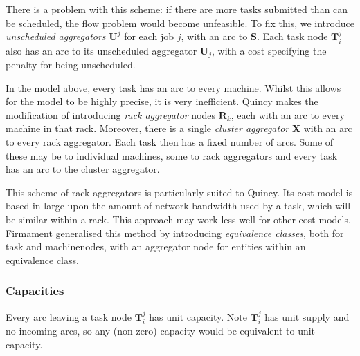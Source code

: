 There is a problem with this scheme: if there are more tasks submitted than can be scheduled, the flow problem would become unfeasible. To fix this, we introduce \emph{unscheduled aggregators} $\mathbf{U}^j$ for each job $j$, with an arc to $\mathbf{S}$. Each task node $\mathbf{T}_i^j$ also has an arc to its unscheduled aggregator $\mathbf{U}_j$, with a cost specifying the penalty for being unscheduled.

In the model above, every task has an arc to every machine. Whilst this allows for the model to be highly precise, it is very inefficient\footnotemark. Quincy makes the modification of introducing \emph{rack aggregator} nodes $\mathbf{R}_k$, each with an arc to every machine in that rack. Moreover, there is a single \emph{cluster aggregator} $\mathbf{X}$ with an arc to every rack aggregator\footnotemark. Each task then has a fixed number of arcs. Some of these may be to individual machines, some to rack aggregators and every task has an arc to the cluster aggregator. 

This scheme of rack aggregators is particularly suited to Quincy. Its cost model is based in large upon the amount of network bandwidth used by a task, which will be similar within a rack. This approach may work less well for other cost models. Firmament generalised this method by introducing \emph{equivalence classes}, both for task and machine\footnotemark nodes, with an aggregator node for entities within an equivalence class.

\subsubsection{Capacities}

Every arc leaving a task node $\mathbf{T}_i^j$ has unit capacity. Note $\mathbf{T}_i^j$ has unit supply and no incoming arcs, so any (non-zero) capacity would be equivalent to unit capacity.

